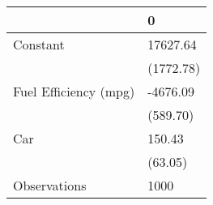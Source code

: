 \begin{tabular}{ll}
\toprule
{} &          0 \\
\midrule
Constant              &   17627.64 \\
                      &  (1772.78) \\
Fuel Efficiency (mpg) &   -4676.09 \\
                      &   (589.70) \\
Car                   &     150.43 \\
                      &    (63.05) \\
Observations          &       1000 \\
\bottomrule
\end{tabular}
